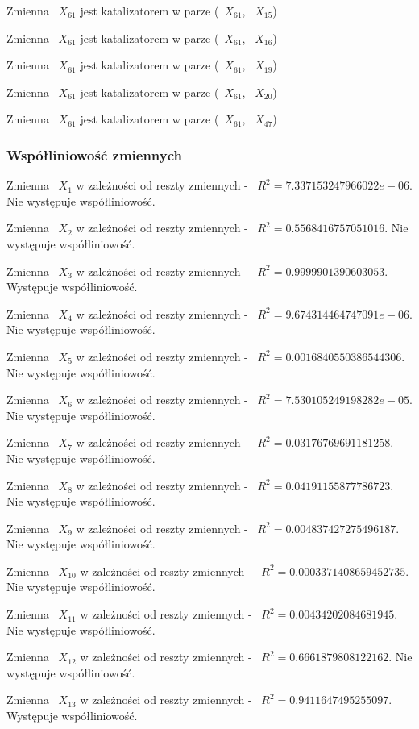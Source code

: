 \documentclass{article}
\begin{document}
Zmienna ~$X_{61}$ jest katalizatorem w parze (~$X_{61}$, ~$X_{15}$)

Zmienna ~$X_{61}$ jest katalizatorem w parze (~$X_{61}$, ~$X_{16}$)

Zmienna ~$X_{61}$ jest katalizatorem w parze (~$X_{61}$, ~$X_{19}$)

Zmienna ~$X_{61}$ jest katalizatorem w parze (~$X_{61}$, ~$X_{20}$)

Zmienna ~$X_{61}$ jest katalizatorem w parze (~$X_{61}$, ~$X_{47}$)

\subsubsection{Współliniowość zmiennych}
Zmienna ~$X_{1}$ w zależności od reszty zmiennych - ~$R^2 = 7.337153247966022e-06$.
Nie występuje współliniowość.

Zmienna ~$X_{2}$ w zależności od reszty zmiennych - ~$R^2 = 0.5568416757051016$.
Nie występuje współliniowość.

Zmienna ~$X_{3}$ w zależności od reszty zmiennych - ~$R^2 = 0.9999901390603053$.
Występuje współliniowość.

Zmienna ~$X_{4}$ w zależności od reszty zmiennych - ~$R^2 = 9.674314464747091e-06$.
Nie występuje współliniowość.

Zmienna ~$X_{5}$ w zależności od reszty zmiennych - ~$R^2 = 0.0016840550386544306$.
Nie występuje współliniowość.

Zmienna ~$X_{6}$ w zależności od reszty zmiennych - ~$R^2 = 7.530105249198282e-05$.
Nie występuje współliniowość.

Zmienna ~$X_{7}$ w zależności od reszty zmiennych - ~$R^2 = 0.03176769691181258$.
Nie występuje współliniowość.

Zmienna ~$X_{8}$ w zależności od reszty zmiennych - ~$R^2 = 0.04191155877786723$.
Nie występuje współliniowość.

Zmienna ~$X_{9}$ w zależności od reszty zmiennych - ~$R^2 = 0.004837427275496187$.
Nie występuje współliniowość.

Zmienna ~$X_{10}$ w zależności od reszty zmiennych - ~$R^2 = 0.0003371408659452735$.
Nie występuje współliniowość.

Zmienna ~$X_{11}$ w zależności od reszty zmiennych - ~$R^2 = 0.00434202084681945$.
Nie występuje współliniowość.

Zmienna ~$X_{12}$ w zależności od reszty zmiennych - ~$R^2 = 0.6661879808122162$.
Nie występuje współliniowość.

Zmienna ~$X_{13}$ w zależności od reszty zmiennych - ~$R^2 = 0.9411647495255097$.
Występuje współliniowość.
\end{document}
